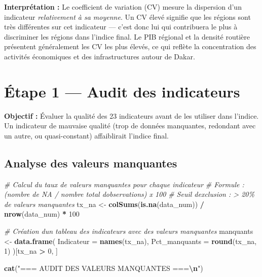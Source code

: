 \documentclass[
]{article}
\newenvironment{Shaded}{\begin{snugshade}}{\end{snugshade}}
\newcommand{\AttributeTok}[1]{\textcolor[rgb]{0.13,0.29,0.53}{#1}}
\newcommand{\CommentTok}[1]{\textcolor[rgb]{0.56,0.35,0.01}{\textit{#1}}}
\newcommand{\DecValTok}[1]{\textcolor[rgb]{0.00,0.00,0.81}{#1}}
\newcommand{\FunctionTok}[1]{\textcolor[rgb]{0.13,0.29,0.53}{\textbf{#1}}}
\newcommand{\NormalTok}[1]{#1}
\newcommand{\OtherTok}[1]{\textcolor[rgb]{0.56,0.35,0.01}{#1}}
\newcommand{\SpecialCharTok}[1]{\textcolor[rgb]{0.81,0.36,0.00}{\textbf{#1}}}
\newcommand{\StringTok}[1]{\textcolor[rgb]{0.31,0.60,0.02}{#1}}
\begin{document}
\textbf{Interprétation :} Le coefficient de variation (CV) mesure la
dispersion d'un indicateur \emph{relativement à sa moyenne}. Un CV élevé
signifie que les régions sont très différentes sur cet indicateur ---
c'est donc lui qui contribuera le plus à discriminer les régions dans
l'indice final. Le PIB régional et la densité routière présentent
généralement les CV les plus élevés, ce qui reflète la concentration des
activités économiques et des infrastructures autour de Dakar.

\newpage

\section{Étape 1 --- Audit des
indicateurs}\label{uxe9tape-1-audit-des-indicateurs}

\textbf{Objectif :} Évaluer la qualité des 23 indicateurs avant de les
utiliser dans l'indice. Un indicateur de mauvaise qualité (trop de
données manquantes, redondant avec un autre, ou quasi-constant)
affaiblirait l'indice final.

\subsection{Analyse des valeurs
manquantes}\label{analyse-des-valeurs-manquantes}

\begin{Shaded}
\begin{Highlighting}[]
\CommentTok{\# Calcul du taux de valeurs manquantes pour chaque indicateur}
\CommentTok{\# Formule : (nombre de NA / nombre total d\textquotesingle{}observations) x 100}
\CommentTok{\# Seuil d\textquotesingle{}exclusion : \textgreater{} 20\% de valeurs manquantes}
\NormalTok{tx\_na }\OtherTok{\textless{}{-}} \FunctionTok{colSums}\NormalTok{(}\FunctionTok{is.na}\NormalTok{(data\_num)) }\SpecialCharTok{/} \FunctionTok{nrow}\NormalTok{(data\_num) }\SpecialCharTok{*} \DecValTok{100}

\CommentTok{\# Création d\textquotesingle{}un tableau des indicateurs avec des valeurs manquantes}
\NormalTok{manquants }\OtherTok{\textless{}{-}} \FunctionTok{data.frame}\NormalTok{(}
  \AttributeTok{Indicateur =} \FunctionTok{names}\NormalTok{(tx\_na),}
  \AttributeTok{Pct\_manquants =} \FunctionTok{round}\NormalTok{(tx\_na, }\DecValTok{1}\NormalTok{)}
\NormalTok{)[tx\_na }\SpecialCharTok{\textgreater{}} \DecValTok{0}\NormalTok{, ]}

\FunctionTok{cat}\NormalTok{(}\StringTok{"=== AUDIT DES VALEURS MANQUANTES ===}\SpecialCharTok{\textbackslash{}n}\StringTok{"}\NormalTok{)}
\end{Highlighting}
\end{Shaded}
\end{document}
